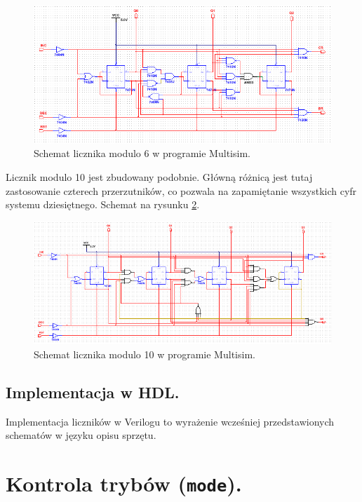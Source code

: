 \documentclass[a4paper,oneside]{report}
\newcommand{\counter}[1]{\texttt{counter\textunderscore #1}}
\newcommand{\mode}{\texttt{mode}}
\begin{document}
\begin{figure}[h]
\centering
\includegraphics[width=\textwidth]{multisim/counter6.png}
\caption[Schemat licznika modulo 6.]{Schemat licznika modulo 6 w programie Multisim.}
\label{counter6_scheme}
\end{figure}

Licznik modulo 10 jest zbudowany podobnie. Główną różnicą jest tutaj
zastosowanie czterech przerzutników, co pozwala na zapamiętanie
wszystkich cyfr systemu dziesiętnego. Schemat na rysunku
\ref{counter10_scheme}.
\begin{figure}[h]
\centering
\includegraphics[width=\textwidth]{multisim/counter10.png}
\caption[Schemat licznika modulo 10.]{Schemat licznika modulo 10 w programie Multisim.}
\label{counter10_scheme}
\end{figure}

\pagebreak
\subsection{Implementacja w HDL.}
Implementacja liczników w Verilogu to wyrażenie wcześniej
przedstawionych schematów w języku opisu sprzętu.



\section{Kontrola trybów (\mode).}
\end{document}
